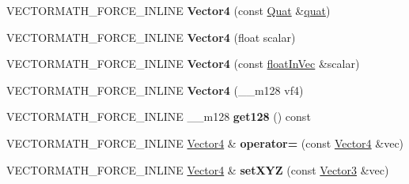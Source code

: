 \begin{DoxyCompactItemize}
\item 
\hypertarget{class_vectormath_1_1_aos_1_1_vector4_a82a4a71383f2b05c053b00a4f13f9dda}{V\+E\+C\+T\+O\+R\+M\+A\+T\+H\+\_\+\+F\+O\+R\+C\+E\+\_\+\+I\+N\+L\+I\+N\+E {\bfseries Vector4} (const \hyperlink{class_vectormath_1_1_aos_1_1_quat}{Quat} \&\hyperlink{classquat}{quat})}\label{class_vectormath_1_1_aos_1_1_vector4_a82a4a71383f2b05c053b00a4f13f9dda}

\item 
\hypertarget{class_vectormath_1_1_aos_1_1_vector4_ab619fab419710166c719f7c2ff8d55f2}{V\+E\+C\+T\+O\+R\+M\+A\+T\+H\+\_\+\+F\+O\+R\+C\+E\+\_\+\+I\+N\+L\+I\+N\+E {\bfseries Vector4} (float scalar)}\label{class_vectormath_1_1_aos_1_1_vector4_ab619fab419710166c719f7c2ff8d55f2}

\item 
\hypertarget{class_vectormath_1_1_aos_1_1_vector4_afd10162a6052cae82da3f8f17559338c}{V\+E\+C\+T\+O\+R\+M\+A\+T\+H\+\_\+\+F\+O\+R\+C\+E\+\_\+\+I\+N\+L\+I\+N\+E {\bfseries Vector4} (const \hyperlink{class_vectormath_1_1float_in_vec}{float\+In\+Vec} \&scalar)}\label{class_vectormath_1_1_aos_1_1_vector4_afd10162a6052cae82da3f8f17559338c}

\item 
\hypertarget{class_vectormath_1_1_aos_1_1_vector4_a7c5c2a6706f222d41afc6e90bac0577b}{V\+E\+C\+T\+O\+R\+M\+A\+T\+H\+\_\+\+F\+O\+R\+C\+E\+\_\+\+I\+N\+L\+I\+N\+E {\bfseries Vector4} (\+\_\+\+\_\+m128 vf4)}\label{class_vectormath_1_1_aos_1_1_vector4_a7c5c2a6706f222d41afc6e90bac0577b}

\item 
\hypertarget{class_vectormath_1_1_aos_1_1_vector4_ae88ced335a3b2910a4b6232d86a14d0b}{V\+E\+C\+T\+O\+R\+M\+A\+T\+H\+\_\+\+F\+O\+R\+C\+E\+\_\+\+I\+N\+L\+I\+N\+E \+\_\+\+\_\+m128 {\bfseries get128} () const }\label{class_vectormath_1_1_aos_1_1_vector4_ae88ced335a3b2910a4b6232d86a14d0b}

\item 
\hypertarget{class_vectormath_1_1_aos_1_1_vector4_a738fa8a9e58a0c07eae2d5c35fa5a3b0}{V\+E\+C\+T\+O\+R\+M\+A\+T\+H\+\_\+\+F\+O\+R\+C\+E\+\_\+\+I\+N\+L\+I\+N\+E \hyperlink{class_vectormath_1_1_aos_1_1_vector4}{Vector4} \& {\bfseries operator=} (const \hyperlink{class_vectormath_1_1_aos_1_1_vector4}{Vector4} \&vec)}\label{class_vectormath_1_1_aos_1_1_vector4_a738fa8a9e58a0c07eae2d5c35fa5a3b0}

\item 
\hypertarget{class_vectormath_1_1_aos_1_1_vector4_a88cc1f151a0de0b632d9eda9f4048403}{V\+E\+C\+T\+O\+R\+M\+A\+T\+H\+\_\+\+F\+O\+R\+C\+E\+\_\+\+I\+N\+L\+I\+N\+E \hyperlink{class_vectormath_1_1_aos_1_1_vector4}{Vector4} \& {\bfseries set\+X\+Y\+Z} (const \hyperlink{class_vectormath_1_1_aos_1_1_vector3}{Vector3} \&vec)}\label{class_vectormath_1_1_aos_1_1_vector4_a88cc1f151a0de0b632d9eda9f4048403}


\end{DoxyCompactItemize}
